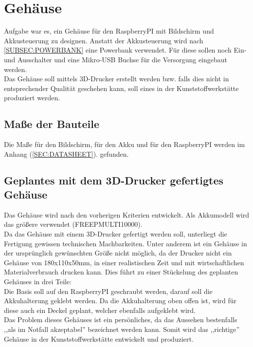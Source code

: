 \documentclass[12pt,a4paper]{article}
\begin{document}
{%
\clearpage\vfill\newpage{}
\section{Gehäuse}
\label{SEC:case}

Aufgabe war es, ein Gehäuse für den RaspberryPI mit Bildschirm und Akkusteuerung zu designen. Anstatt der Akkusteuerung wird nach \ref{SUBSEC:POWERBANK} eine Powerbank verwendet. Für diese sollen noch Ein- und Ausschalter und eine Mikro-USB Buchse für die Versorgung eingebaut werden. \\
Das Gehäuse soll mittels 3D-Drucker erstellt werden bzw. falls dies nicht in entsprechender Qualität geschehen kann, soll eines in der Kunststoffwerkstätte produziert werden.\\

\subsection{Maße der Bauteile}

Die Maße für den Bildschirm, für den Akku und für den RaspberryPI werden im Anhang  (\ref{SEC:DATASHEET}).
gefunden.

\subsection{Geplantes mit dem 3D-Drucker gefertigtes Gehäuse}

Das Gehäuse wird nach den vorherigen Kriterien entwickelt.  Als Akkumodell wird das größere verwendet (FREEPMULTI10000).\\
Da das Gehäuse mit einem 3D-Drucker gefertigt werden soll, unterliegt die Fertigung gewissen technischen Machbarkeiten. Unter anderem ist ein Gehäuse in der ursprünglich gewünschten Größe nicht möglich, da der Drucker nicht ein Gehäuse von 180x110x50mm, in einer realistischen Zeit und mit wirtschaftlichen Materialverbrauch drucken kann. Dies führt zu einer Stückelung des geplanten Gehäuses in drei Teile: \\
Die Basis soll auf den RaspberryPI geschraubt werden, darauf soll die Akkuhalterung geklebt werden. Da die Akkuhalterung oben offen ist, wird für diese auch ein Deckel geplant, welcher ebenfalls aufgeklebt wird. \\
Das Problem dieses Gehäuses ist ein persönliches, da das Aussehen bestenfalls ,,als im Notfall akzeptabel'' bezeichnet werden kann. Somit wird das ,,richtige'' Gehäuse in der Kunststoffwerkstätte entwickelt und produziert. 

}
\end{document}
